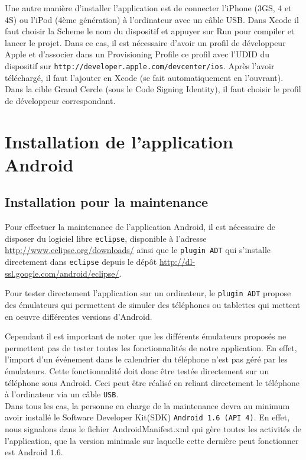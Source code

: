 \documentclass[a4paper, 11px]{article}
\begin{document}
Une autre manière d'installer l'application est de connecter l'iPhone (3GS, 4 et 4S) ou l'iPod (4ème génération) à l'ordinateur avec un câble USB. Dans Xcode il faut choisir la \og Scheme \fg le nom du dispositif et appuyer sur Run pour compiler et lancer le projet.
Dans ce cas, il est nécessaire d'avoir un profil de développeur Apple et d'associer dans un Provisioning Profile ce profil avec l'UDID du dispositif sur \texttt{http://developer.apple.com/devcenter/ios}. Après l'avoir téléchargé, il faut l'ajouter en Xcode (se fait automatiquement en l'ouvrant). Dans la cible Grand Cercle (sous le Code Signing Identity), il faut choisir le profil de développeur correspondant.


\section{Installation de l'application Android}
\subsection{Installation pour la maintenance}
Pour effectuer la maintenance de l'application Android, il est nécessaire de disposer du logiciel libre \texttt{eclipse}, disponible à l'adresse \href{http://www.eclipse.org/downloads/}{http://www.eclipse.org/downloads/} ainsi que le \texttt{plugin ADT} qui s'installe directement dans \texttt{eclipse} depuis le dépôt \href{http://dl-ssl.google.com/android/eclipse/}{http://dl-ssl.google.com/android/eclipse/}.

Pour tester directement l'application sur un ordinateur, le \texttt{plugin ADT} propose des émulateurs qui permettent de simuler des téléphones ou tablettes qui mettent en oeuvre différentes versions d'Android.

Cependant il est important de noter que les différents émulateurs proposés ne permettent pas de tester toutes les fonctionnalités de notre application. En effet, l'import d'un événement dans le calendrier du téléphone n'est pas géré par les émulateurs. Cette fonctionnalité doit donc être testée directement sur un téléphone sous Android. Ceci peut être réalisé en reliant directement le téléphone à l'ordinateur via un câble \texttt{USB}.\\

Dans tous les cas, la personne en charge de la maintenance devra au minimum avoir installé le Software Developer Kit(SDK) \texttt{Android 1.6 (API 4)}. En effet, nous signalons dans le fichier AndroidManifest.xml qui gère toutes les activités de l'application, que la version minimale sur laquelle cette dernière peut fonctionner est Android $1.6$.\\
\end{document}
